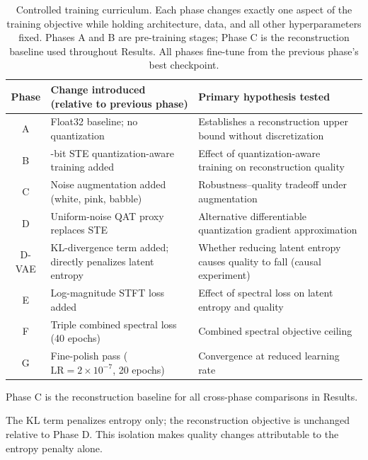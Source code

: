 \begin{table}[t]
\caption[Controlled training curriculum]{Controlled training curriculum. Each phase changes exactly one aspect of the
training objective while holding architecture, data, and all other hyperparameters fixed.
Phases A and B are pre-training stages; Phase C is the reconstruction baseline used
throughout Results. All phases fine-tune from the previous phase's best checkpoint.}
\label{tab:curriculum}
\begin{threeparttable}
\begin{tabular}{c
>{\raggedright\arraybackslash}p{5.5cm}
>{\raggedright\arraybackslash}p{4.5cm}}
\toprule
Phase
& Change introduced (relative to previous phase)
& Primary hypothesis tested \\
\midrule
A
& Float32 baseline; no quantization
& Establishes a reconstruction upper bound without discretization \\[2pt]
B
& 3-bit STE quantization-aware training added
& Effect of quantization-aware training on reconstruction quality \\[2pt]
C\tnote{a}
& Noise augmentation added (white, pink, babble)
& Robustness--quality tradeoff under augmentation \\[2pt]
D
& Uniform-noise QAT proxy replaces STE
& Alternative differentiable quantization gradient approximation \\[2pt]
D-VAE\tnote{b}
& KL-divergence term added; directly penalizes latent entropy
& Whether reducing latent entropy causes quality to fall (causal experiment) \\[2pt]
E
& Log-magnitude STFT loss added
& Effect of spectral loss on latent entropy and quality \\[2pt]
F
& Triple combined spectral loss (40 epochs)
& Combined spectral objective ceiling \\[2pt]
G
& Fine-polish pass ($\text{LR} = 2\times10^{-7}$, 20 epochs)
& Convergence at reduced learning rate \\
\bottomrule
\end{tabular}
\begin{tablenotes}
\footnotesize
\item[a] Phase C is the reconstruction baseline for all cross-phase comparisons in Results.
\item[b] The KL term penalizes entropy only; the reconstruction objective is unchanged
relative to Phase D. This isolation makes quality changes attributable to the
entropy penalty alone.
\end{tablenotes}
\end{threeparttable}
\end{table}
